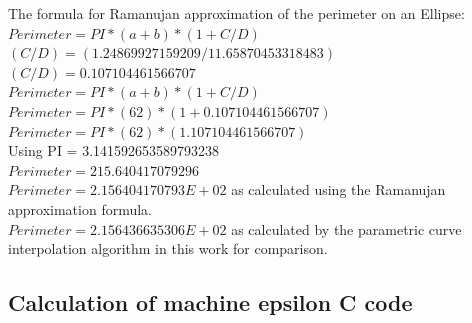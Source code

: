 \clearpage 
\pagebreak 

\noindent
The formula for Ramanujan approximation of the perimeter on an Ellipse:\\
\noindent
$Perimeter = PI*(a + b)*(1 + C/D) $ \\

\singlespacing
\noindent
$ (C/D) = (1.24869927159209 / 11.65870453318483) $ \\
$ (C/D) = 0.107104461566707 $ \\

\singlespacing
\noindent
$Perimeter = PI*(a + b)*(1 + C/D)$ \\
$Perimeter = PI*(62)*(1 + 0.107104461566707)$ \\
$Perimeter = PI*(62)*(1.107104461566707)$ \\

\singlespacing
\noindent
Using PI = 3.141592653589793238\\
$Perimeter = 215.640417079296 $ \\
$Perimeter = 2.156404170793E+02 $ as calculated using the Ramanujan approximation formula. \\

\doublespacing
\noindent
$Perimeter = 2.156436635306E+02 $ as calculated by the parametric curve interpolation algorithm in this work for comparison. \\

\clearpage
\pagebreak

\subsection{Calculation of machine epsilon C code}
\label{app4-Calculation of machine epsilon C code}

